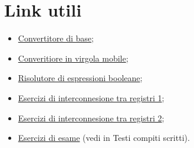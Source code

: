 \chapter*{Link utili}

\begin{itemize}
    \item \href{https://www.fauser.edu/~fuligni/convbasejs/converti.html}{Convertitore di base};
    \item \href{https://evanw.github.io/float-toy/}{Converitiore in virgola mobile};
    \item \href{https://www.boolean-algebra.com/}{Risolutore di espressioni booleane};
    \item \href{https://twiki.di.uniroma1.it/pub/Architetture1/PZ/Esercitazioni/registri.pdf}{Esercizi di interconnesione tra registri 1};
    \item \href{https://twiki.di.uniroma1.it/twiki/view/Architetture1/PZ/Esercitazioni}{Esercizi di interconnesione tra registri 2};
    \item \href{https://twiki.di.uniroma1.it/twiki/view/Architetture1/EO/CanaleE_O}{Esercizi di esame} (vedi in Testi compiti scritti).
\end{itemize}

